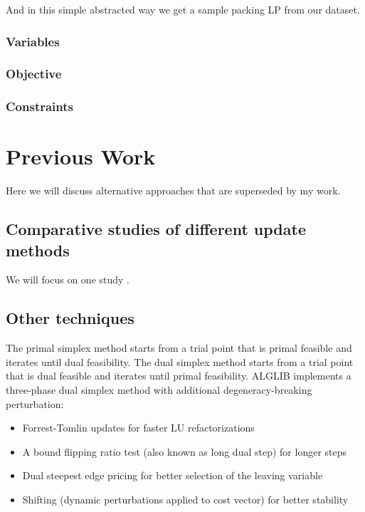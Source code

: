 And in this simple abstracted way we get a sample packing LP from our dataset.
\subsubsection{Variables}
\subsubsection{Objective}
\subsubsection{Constraints}

\section{Previous Work}
Here we will discuss alternative approaches that are superseded by my work.
\subsection{Comparative studies of different update methods}
We will focus on one study \parencite{huangfu2015novel}.
\subsection{Other techniques}
The primal simplex method starts from a trial point that is primal feasible and iterates until dual feasibility.
The dual simplex method starts from a trial point that is dual feasible and iterates until primal feasibility.
ALGLIB implements a three-phase dual simplex method with additional degeneracy-breaking perturbation:
\begin{itemize}
    \item Forrest-Tomlin updates for faster LU refactorizations
    \item A bound flipping ratio test (also known as long dual step) for longer steps
    \item Dual steepest edge pricing for better selection of the leaving variable
    \item Shifting (dynamic perturbations applied to cost vector) for better stability
\end{itemize}
